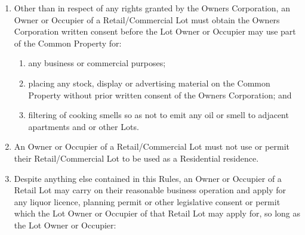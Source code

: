 \documentclass{article}
\begin{document}
\begin{enumerate}[label=\arabic*.]
\begin{enumerate}[label=\arabic{enumi}.\arabic*.]
\begin{enumerate}[label=\arabic{enumi}.\arabic*.]
\begin{enumerate}[label=(\arabic*)]
\begin{enumerate}[label=(\alph*)]
\item  not permit electronic gaming machines to be installed or operated for their Lot;

\item  make sure that all walls, floor and ceiling linings and treatments are acoustically treated to an acoustic performance level of RW50; and

\item  maintain (if applicable) any car park area allocated to the Retail or Commercial Lot, including compliance with occupational health and safety legislation in carrying on the business from its Lot and comply with any requirements of local council or other relevant statutory body regarding the car park.

\end{enumerate}

\item  Other than in respect of any rights granted by the Owners Corporation, an Owner or Occupier of a Retail/Commercial Lot must obtain the Owners Corporation written consent before the Lot Owner or Occupier may use part of the Common Property for:
\newpage



\begin{enumerate}[label=(\alph*)]

\item  any business or commercial purposes;

\item  placing any stock, display or advertising material on the Common Property without prior written consent of the Owners Corporation; and

\item  filtering of cooking smells so as not to emit any oil or smell to adjacent apartments and or other Lots.

\end{enumerate}

\item  An Owner or Occupier of a Retail/Commercial Lot must not use or permit their Retail/Commercial Lot to be used as a Residential residence.

\item  Despite anything else contained in this Rules, an Owner or Occupier of a Retail Lot may carry on their reasonable business operation and apply for any liquor licence, planning permit or other legislative consent or permit which the Lot Owner or Occupier of that Retail Lot may apply for, so long as the Lot Owner or Occupier:


\end{enumerate}
\end{enumerate}
\end{enumerate}
\end{enumerate}
\end{document}

